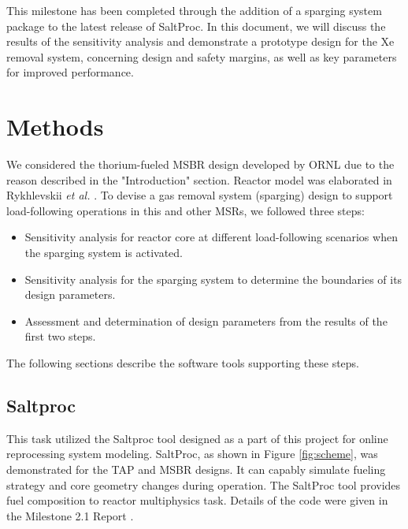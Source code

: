     This milestone has been completed through the addition of a sparging system 
    package to the latest release of SaltProc. In this document, we will discuss 
    the results of the sensitivity analysis and demonstrate a prototype design 
    for the Xe removal system, concerning design and safety margins, as well as 
    key parameters for improved performance.

\section{Methods}

    We considered the thorium-fueled MSBR design 
    \cite{robertson_conceptual_1971} developed by ORNL due to the reason 
    described in the "Introduction" section. Reactor model was elaborated in 
    Rykhlevskii \emph{et al.} \cite{rykhlevskii_modeling_2019}.
    To devise a gas removal system (sparging) design to support load-following 
                    operations in this and other \glspl{MSR}, we followed three steps:
    \begin{itemize}
        \item Sensitivity analysis for reactor core at different load-following 
                scenarios when the sparging system is activated.
        \item Sensitivity analysis for the sparging system to determine the 
                boundaries of its design parameters.
        \item Assessment and determination of design parameters from the 
                results of the first two steps.
    \end{itemize}

The following sections describe the software tools supporting these steps.
\subsection{Saltproc}

    This task utilized the Saltproc tool \cite{rykhlevskii_saltproc_2018} 
                    designed as a part of this project for online 
    reprocessing system modeling. SaltProc, as shown in Figure 
    \ref{fig:scheme},
    was demonstrated for the TAP and MSBR designs. It can capably simulate 
                    fueling strategy and core geometry changes during operation. 
    The SaltProc tool provides fuel composition to reactor multiphysics task. 
    Details of the code were given in the Milestone 2.1 Report 
    \cite{rykhlevskii_milestone_2019}.

